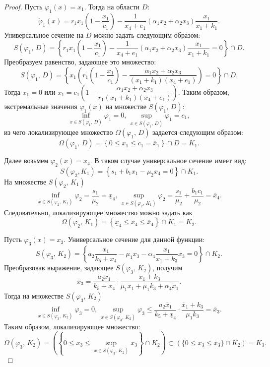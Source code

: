 \documentclass[14pt,a4paper]{extarticle}
\begin{document}
	\begin{proof} 
		Пусть $\varphi_1(x)=x_1$. Тогда на области $D$:
		\[\dot{\varphi}_1(x)=r_1x_1\left(1-\dfrac{x_1}{c_1}\right)-\dfrac{1}{x_4+e_1}(\alpha_1x_2+\alpha_2x_3)\dfrac{x_1}{x_1+k_1}.\]
		Универсальное сечение на $D$ можно задать следующим образом:
		\[S(\varphi_1,\, D)=\left\{r_1x_1\left(1-\dfrac{x_1}{c_1}\right)-\dfrac{1}{x_4+e_1}(\alpha_1x_2+\alpha_2x_3)\dfrac{x_1}{x_1+k_1}=0\right\}\cap D.\]
		Преобразуем равенство, задающее это множество:
		\[S(\varphi_1,\, D)=\left\{x_1\left(r_1\left(1-\dfrac{x_1}{c_1}\right)-\dfrac{\alpha_1x_2+\alpha_2x_3}{(x_1+k_1)(x_4+e_1)}\right)=0\right\}\cap D.\]
		Тогда $x_1=0$ или $x_1=c_1\left(1-\dfrac{\alpha_1x_2+\alpha_2x_3}{r_1(x_1+k_1)(x_4+e_1)}\right) $. Таким образом, экстремальные значения $\varphi_1(x)$ на множестве $S(\varphi_1,\, D)$:
		\[\inf\limits_{x\in S(\varphi_1,\, D)} \varphi_1=0,\, \sup\limits_{x\in S(\varphi_1,\, D)} \varphi_1=c_1,\]
		из чего локализирующее множество $\Omega(\varphi_1,\, D)$ задается следующим образом:
		\[\Omega(\varphi_1,\, D)=\left\{0\leqslant x_1\leqslant c_1 = \overline{x}_1\right\}\cap D=K_1.\]
		
		Далее возьмем $\varphi_2(x)=x_4$. В таком случае универсальное сечение имеет вид:
		\[S(\varphi_2, K_1)=\left\{s_1 + b_1x_1-\mu_2x_4=0\right\}\cap K_1.\]
		На множестве $S(\varphi_2,\, K_1)$
		\[\inf\limits_{x\in S(\varphi_2,\, K_1)} \varphi_2=\dfrac{s_1}{\mu_2} = \underline{x}_4,\, \sup\limits_{x\in S(\varphi_2,\, K_1)} \varphi_2=\dfrac{s_1}{\mu_2}+\dfrac{b_1c_1}{\mu_2} = \overline{x}_4.\]
		Следовательно, локализирующее множество можно задать как 
		\[\Omega(\varphi_2,\, K_1)=\left\{\underline{x}_4 \leqslant x_4\leqslant \overline{x}_4\right\}\cap K_1=K_2.\]
		
		Пусть $\varphi_3(x)=x_3$. Универсальное сечение для данной функции:
		\[S(\varphi_3,\, K_2)=\left\{a_2\dfrac{x_1}{k_5+x_4}-\mu_1x_3-\alpha_4\dfrac{x_1}{x_1+k_3}x_3=0\right\}\cap K_2.\]
		Преобразовав выражение, задающее $S(\varphi_3,\, K_2)$, получим
		\[x_3=\dfrac{a_2x_1}{k_5+x_4}\cdot\dfrac{x_1+k_3}{\mu_1x_1+\mu_1k_3+\alpha_4x_1}.\]
		Тогда на множестве $S(\varphi_3,\, K_2)$
		\[\inf\limits_{x\in S(\varphi_3,\, K_2)} \varphi_3=0,\, \sup\limits_{x\in S(\varphi_3,\, K_2)} \varphi_3\leqslant \dfrac{a_2\overline{x}_1}{k_5+\underline{x}_4}\cdot\dfrac{\overline{x}_1+k_3}{\mu_1k_3}=\overline{x}_3.\]
		Таким образом, локализирующее множество:
		\[\Omega(\varphi_3,\, K_2) = \left(\left\{0\leqslant x_3 \leqslant \sup\limits_{x\in S(\varphi_3,\, K_2)} x_3\right\}\cap K_2\right) \subset (\{0 \leqslant x_3\leqslant \overline x_3\} \cap K_2) = K_3.\]
		

\end{proof}
\end{document}
